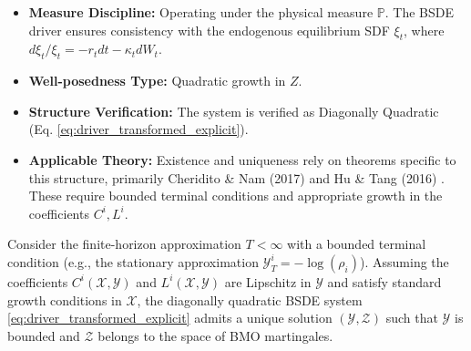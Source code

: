 \begin{tcolorbox}[colback=red!5!white, colframe=red!75!black, title={Hard Pre-Checks: QBSDE Gates Verified}]
\begin{itemize}
    \item \textbf{Measure Discipline:} Operating under the physical measure $\mathbb{P}$. The BSDE driver ensures consistency with the endogenous equilibrium SDF $\xi_t$, where $d\xi_t/\xi_t = -r_t dt - \kappa_t dW_t$.
    \item \textbf{Well-posedness Type:} Quadratic growth in $Z$.
    \item \textbf{Structure Verification:} The system is verified as Diagonally Quadratic (Eq. \ref{eq:driver_transformed_explicit}).
    \item \textbf{Applicable Theory:} Existence and uniqueness rely on theorems specific to this structure, primarily Cheridito \& Nam (2017) \cite{CheriditoNam2017} and Hu \& Tang (2016) \cite{HuTang2016}. These require bounded terminal conditions and appropriate growth in the coefficients $C^i, L^i$.
\end{itemize}
\end{tcolorbox}

\begin{theorem}
\label{thm:GE_QBSDE_Existence}
Consider the finite-horizon approximation $T<\infty$ with a bounded terminal condition (e.g., the stationary approximation $\mathcal{Y}_T^i = -\log(\rho_i)$). Assuming the coefficients $C^i(\mathcal{X}, \mathcal{Y})$ and $L^i(\mathcal{X}, \mathcal{Y})$ are Lipschitz in $\mathcal{Y}$ and satisfy standard growth conditions in $\mathcal{X}$, the diagonally quadratic BSDE system \eqref{eq:driver_transformed_explicit} admits a unique solution $(\mathcal{Y}, \mathcal{Z})$ such that $\mathcal{Y}$ is bounded and $\mathcal{Z}$ belongs to the space of BMO martingales.
\end{theorem}


